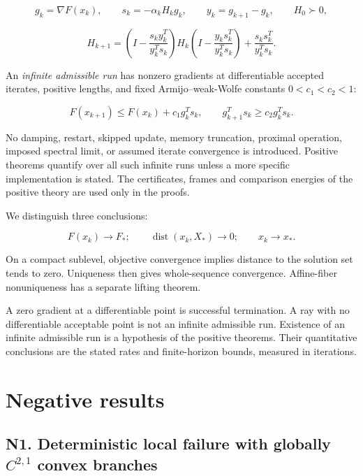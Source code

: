 \[
 g_k=\nabla F(x_k),\qquad s_k=-\alpha_kH_kg_k,\qquad
 y_k=g_{k+1}-g_k,\qquad H_0\succ0,
\]

\[
 H_{k+1}=\left(I-\frac{s_ky_k^T}{y_k^Ts_k}\right)H_k
 \left(I-\frac{y_ks_k^T}{y_k^Ts_k}\right)
 +\frac{s_ks_k^T}{y_k^Ts_k}.
\]

An \emph{infinite admissible run} has nonzero gradients at differentiable accepted iterates, positive lengths, and fixed Armijo--weak-Wolfe constants \(0<c_1<c_2<1\):

\[
 F(x_{k+1})\le F(x_k)+c_1g_k^Ts_k,\qquad
 g_{k+1}^Ts_k\ge c_2g_k^Ts_k.
\]

No damping, restart, skipped update, memory truncation, proximal operation, imposed spectral limit, or assumed iterate convergence is introduced. Positive theorems quantify over all such infinite runs unless a more specific implementation is stated. The certificates, frames and comparison energies of the positive theory are used only in the proofs.

We distinguish three conclusions:

\[
 F(x_k)\to F_*;\qquad \operatorname{dist}(x_k,X_*)\to0;\qquad x_k\to x_*.
\]

On a compact sublevel, objective convergence implies distance to the solution set tends to zero. Uniqueness then gives whole-sequence convergence. Affine-fiber nonuniqueness has a separate lifting theorem.

A zero gradient at a differentiable point is successful termination. A ray with no differentiable acceptable point is not an infinite admissible run. Existence of an infinite admissible run is a hypothesis of the positive theorems. Their quantitative conclusions are the stated rates and finite-horizon bounds, measured in iterations.



\section{Negative results}\label{the-negative-results-that-must-both-be-retained}



\subsection{N1. Deterministic local failure with globally \texorpdfstring{$C^{2,1}$}{C2,1} convex branches}\label{n1.-deterministic-local-failure-with-globally-c21-convex-branches}

